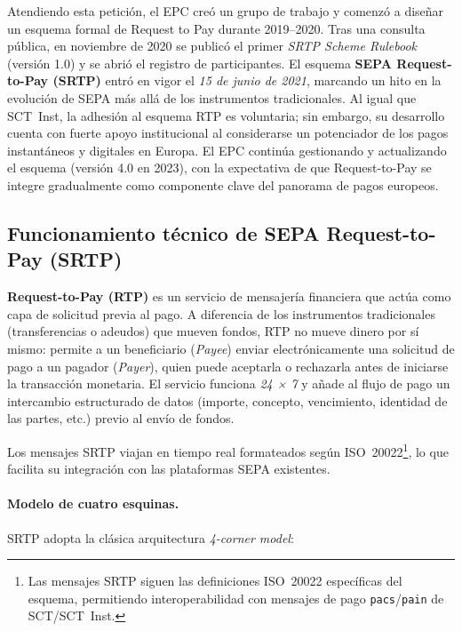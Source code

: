 Atendiendo esta petición, el EPC creó un grupo de trabajo y comenzó a diseñar un esquema formal de Request to Pay durante 2019–2020. Tras una consulta pública, en noviembre de 2020 se publicó el primer \emph{SRTP Scheme Rulebook} (versión 1.0) y se abrió el registro de participantes. El esquema \textbf{SEPA Request-to-Pay (SRTP)} entró en vigor el \textit{15 de junio de 2021}, marcando un hito en la evolución de SEPA más allá de los instrumentos tradicionales. Al igual que SCT~Inst, la adhesión al esquema RTP es voluntaria; sin embargo, su desarrollo cuenta con fuerte apoyo institucional al considerarse un potenciador de los pagos instantáneos y digitales en Europa. El EPC continúa gestionando y actualizando el esquema (versión 4.0 en 2023), con la expectativa de que Request-to-Pay se integre gradualmente como componente clave del panorama de pagos europeos.

\subsection{Funcionamiento técnico de SEPA Request-to-Pay (SRTP)}
\label{subsec:funcionamiento-srtp}

\textbf{Request-to-Pay (RTP)} es un servicio de mensajería financiera que actúa como capa de solicitud previa al pago. A diferencia de los instrumentos tradicionales (transferencias o adeudos) que mueven fondos, RTP no mueve dinero por sí mismo: permite a un beneficiario (\emph{Payee}) enviar electrónicamente una solicitud de pago a un pagador (\emph{Payer}), quien puede aceptarla o rechazarla antes de iniciarse la transacción monetaria. El servicio funciona \emph{24 × 7} y añade al flujo de pago un intercambio estructurado de datos (importe, concepto, vencimiento, identidad de las partes, etc.) previo al envío de fondos.  

Los mensajes SRTP viajan en tiempo real formateados según ISO~20022\footnote{Las mensajes SRTP siguen las definiciones ISO~20022 específicas del esquema, permitiendo interoperabilidad con mensajes de pago \texttt{pacs}/\texttt{pain} de SCT/SCT~Inst.}, lo que facilita su integración con las plataformas SEPA existentes.

\paragraph{Modelo de cuatro esquinas.} SRTP adopta la clásica arquitectura \emph{4-corner model}:

